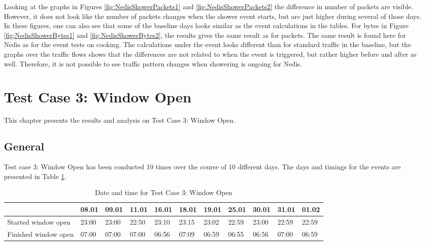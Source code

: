 Looking at the graphs in Figures \ref{fig:NedisShowerPackets1} and \ref{fig:NedisShowerPackets2} the difference in number of packets are visible. However, it does not look like the number of packets changes when the shower event starts, but are just higher during several of those days. In these figures, one can also see that some of the baseline days looks similar as the event calculations in the tables. For bytes in Figure \ref{fig:NedisShowerBytes1} and \ref{fig:NedisShowerBytes2}, the results gives the same result as for packets. The same result is found here for Nedis as for the event tests on cooking. The calculations under the event looks different than for standard traffic in the baseline, but the graphs over the traffic flows shows that the differences are not related to when the event is triggered, but rather higher before and after as well. Therefore, it is not possible to see traffic pattern changes when showering is ongoing for Nedis. 

\newpage
\section{Test Case 3: Window Open}
This chapter presents the results and analysis on Test Case 3: Window Open. 
\subsection{General}
Test case 3: Window Open has been conducted 10 times over the course of 10 different days. The days and timings for the events are presented in Table \ref{tab:WindowDates}.

\begin{table}[H]
    \centering
    \caption{Date and time for Test Case 3: Window Open}
    \begin{adjustbox}{width=1\textwidth} 
            \begin{tabular}{l|l|l|l|l|l|l|l|l|l|l|}
                \cline{2-11}
                & 08.01 & 09.01 & 11.01 & 16.01 & 18.01 & 19.01 & 25.01 & 30.01 & 31.01 & 01.02 \\ \hline
                \multicolumn{1}{|l|}{Started window open}  & 23:00 & 23:00 & 22:50 & 23:10 & 23:15 & 23:02 & 22:59 & 23:00 & 22:59 & 22:59 \\ \hline
                \multicolumn{1}{|l|}{Finished window open} & 07:00 & 07:00 & 07:00 & 06:56 & 07:09 & 06:59 & 06:55 & 06:56 & 07:00 & 06:59 \\ \hline
            \end{tabular}
    \end{adjustbox}
    \label{tab:WindowDates}
\end{table}

